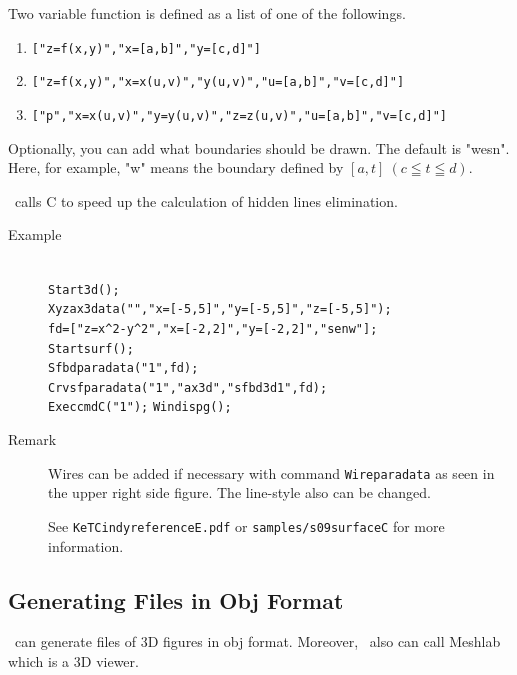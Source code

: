 \documentclass[papersize,a4paper,12pt]{article}
\begin{document}
Two variable function is defined as a list of one of the followings.

\begin{enumerate}[\hspace*{5mm}\bf 1.]
\item \verb|["z=f(x,y)","x=[a,b]","y=[c,d]"]|
\item \verb|["z=f(x,y)","x=x(u,v)","y(u,v)","u=[a,b]","v=[c,d]"]|
\item \verb|["p","x=x(u,v)","y=y(u,v)","z=z(u,v)","u=[a,b]","v=[c,d]"]|
\end{enumerate}

Optionally, you can add what boundaries should be drawn.
The default is "wesn". Here, for example, "w" means the boundary defined by $[a,t]\ (c\leqq t\leqq d)$.

\ketcindy\ calls C to speed up the calculation of hidden lines elimination.

\begin{description}
\item[Example]\mbox{}\\
\verb|Start3d();|\\
\verb|Xyzax3data("","x=[-5,5]","y=[-5,5]","z=[-5,5]");|\\
\verb|fd=["z=x^2-y^2","x=[-2,2]","y=[-2,2]","senw"];|\\
\verb|Startsurf();|\\
\verb|Sfbdparadata("1",fd);|\\
\verb|Crvsfparadata("1","ax3d","sfbd3d1",fd);|\\
\verb|ExeccmdC("1");|
\verb|Windispg();|

\begin{center}
\hspace{10mm}
\end{center}

\item[Remark]Wires can be added if necessary with command \verb|Wireparadata| as seen in the upper right side figure.
The line-style also can be changed.

See \verb|KeTCindyreferenceE.pdf| or \verb|samples/s09surfaceC| for more information.
\end{description}

\subsection{Generating Files in Obj Format}

\ketcindy\ can generate files of 3D figures in obj format. Moreover, \ketcindy\ also can call Meshlab which is a 3D viewer.
\end{document}
